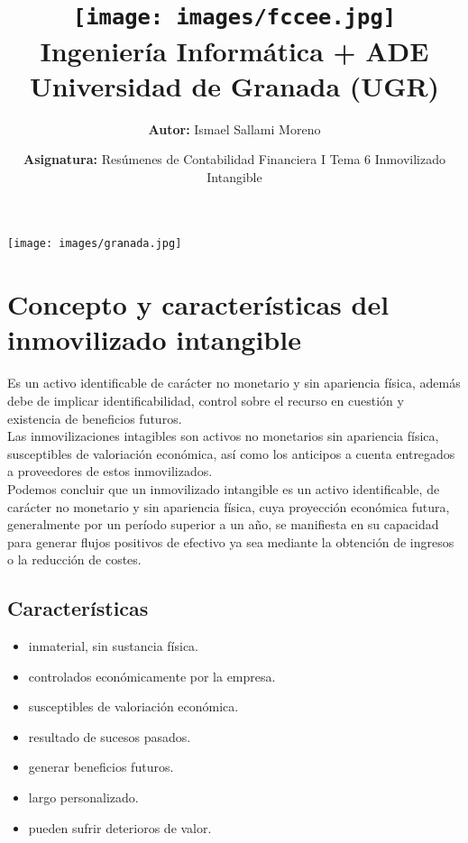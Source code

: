 \documentclass[a4paper,12pt]{article}
\title{
    \vspace{-2cm}
    \texttt{[image: images/fccee.jpg]} \\ %
    \LARGE Ingeniería Informática + ADE\\
    \large Universidad de Granada (UGR)\\[1cm]
}
\author{\textbf{Autor:} Ismael Sallami Moreno}
\date{\textbf{Asignatura:} Resúmenes de Contabilidad Financiera I Tema 6 Inmovilizado Intangible 
}
\begin{document}
\maketitle
\thispagestyle{empty}

\begin{center}
    \texttt{[image: images/granada.jpg]} \\ %
    \vfill
\end{center}

\newpage

\tableofcontents
\newpage

\section{Concepto y características del inmovilizado intangible}

Es un activo identificable de carácter no monetario y sin apariencia física, además debe de implicar identificabilidad, control sobre el recurso en cuestión y existencia de beneficios futuros.\\

Las inmovilizaciones intagibles son activos no monetarios sin apariencia física, susceptibles de valoriación económica, así como los anticipos a cuenta entregados a proveedores de estos inmovilizados.\\

Podemos concluir que un inmovilizado intangible es un activo identificable, de carácter no monetario y sin apariencia física, cuya proyección económica futura, generalmente por un período superior a un año, se manifiesta en su capacidad para generar flujos positivos de efectivo ya sea mediante la obtención de ingresos o la reducción de costes.\\

\subsection{Características}
\begin{itemize}
    \item inmaterial, sin sustancia física.
    \item controlados económicamente por la empresa.
    \item susceptibles de valoriación económica.
    \item resultado de sucesos pasados.
    \item generar beneficios futuros.
    \item largo personalizado.
    \item pueden sufrir deterioros de valor.
\end{itemize}
\end{document}
